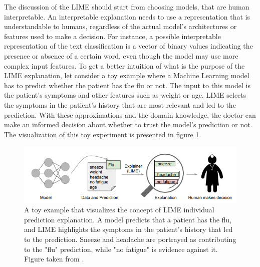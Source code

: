 The discussion of the LIME should start from choosing models, that are human interpretable. An interpretable explanation needs to use a representation that is understandable to humans, regardless of the actual model's architectures or features used to make a decision. For instance, a possible interpretable representation of the text classification is a vector of binary values indicating the presence or absence of a certain word, even though the model may use more complex input features.
To get a better intuition of what is the purpose of the LIME explanation, let consider a toy example where a Machine Learning model has to predict whether the patient has the flu or not. The input to this model is the patient's symptoms and other features such as weight or age. LIME selects the symptoms in the patient's history that are most relevant and led to the prediction. With these approximations and the domain knowledge, the doctor can make an informed decision about whether to trust the model's prediction or not. The visualization of this toy experiment is presented in figure \ref{fig:LIME_doctor}.

\begin{figure}[!htb]
\centering
\includegraphics{figures/lime_doctor.PNG}
\caption{A toy example that visualizes the concept of LIME individual prediction explanation. A model predicts that a patient has the flu, and LIME highlights the symptoms in the patient's history that led to the prediction. Sneeze and headache are portrayed as contributing to the "flu" prediction, while "no fatigue" is evidence against it. Figure taken from \cite{lime}.
\label{fig:LIME_doctor}}
\end{figure} 

